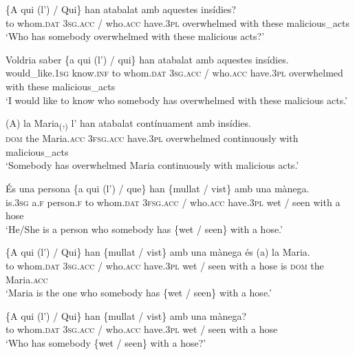 \documentclass[output=paper,colorlinks,citecolor=brown,modfonts,nonflat]{langsci/langscibook}
\begin{document}


 \ex \label{ex:royo:16c}
 \gll \{A qui (l’) / Qui\} han atabalat amb aquestes insídies?\\
to whom.\textsc{dat} \textsc{3sg.acc} / who.\textsc{acc} have.\textsc{3pl} overwhelmed with these malicious\_acts\\
\glt ‘Who has somebody overwhelmed with these malicious acts?’

 \ex \label{ex:royo:16d}
 \gll Voldria saber \{a qui (l’) / qui\} han atabalat amb aquestes insídies.\\
 would\_like.\textsc{1sg} know.\textsc{inf}  to whom.\textsc{dat} \textsc{3sg.acc} / who.\textsc{acc} have.\textsc{3pl} overwhelmed with these malicious\_acts\\
\glt ‘I would like to know who somebody has overwhelmed with these malicious acts.’

\ex \label{ex:royo:16e}
 \gll (A) la Maria\textsubscript{(},\textsubscript{)}  l’ han atabalat contínuament amb insídies.\\
 \textsc{dom} the Maria.\textsc{acc} \textsc{3fsg.acc} have.\textsc{3pl} overwhelmed continuously with malicious\_acts\\
\glt ‘Somebody has overwhelmed Maria continuously with malicious acts.’

 \z
 \z


\ea%
 \label{ex:royo:17}
 \ea \label{ex:royo:17a}
 \gll És una persona \{a qui (l’) / que\} han \{mullat / vist\} amb una mànega.\\
 is.\textsc{3sg} a.\textsc{f} person.\textsc{f} to whom.\textsc{dat} \textsc{3fsg.acc} / who.\textsc{acc} have.\textsc{3pl} wet / seen with a hose\\
\glt ‘He/She is a person who somebody has \{wet / seen\} with a hose.’

 \ex \label{ex:royo:17b}
 \gll \{A qui (l’) / Qui\} han \{mullat / vist\} amb una mànega és (a) la Maria.\\
 to whom.\textsc{dat} \textsc{3sg.acc} / who.\textsc{acc} have.\textsc{3pl} wet / seen with a hose is \textsc{dom} the Maria.\textsc{acc}\\
\glt ‘Maria is the one who somebody has \{wet / seen\} with a hose.’

 \ex \label{ex:royo:17c}
 \gll \{A qui (l’) / Qui\} han \{mullat / vist\} amb una mànega?\\
 to whom.\textsc{dat} \textsc{3sg.acc} / who.\textsc{acc} have.\textsc{3pl} wet / seen with a hose\\
\glt ‘Who has somebody \{wet / seen\} with a hose?’
\end{document}
